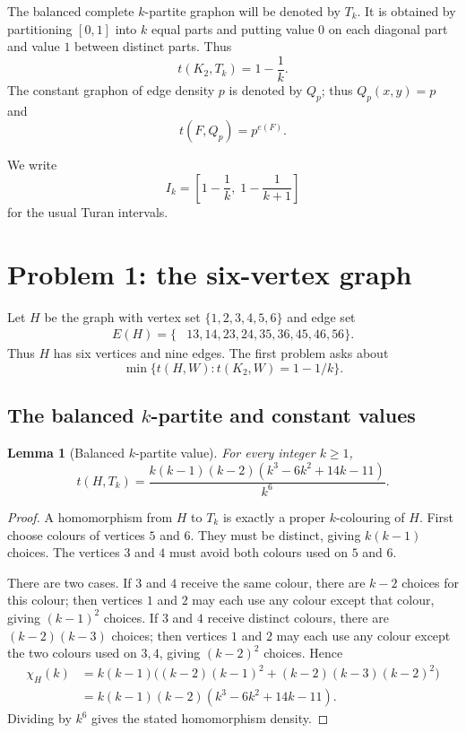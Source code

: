 \documentclass[11pt]{amsart}
\newtheorem{lemma}[theorem]{Lemma}
\theoremstyle{definition}
\newcommand{\1}{\mathbf 1}
\begin{document}
The balanced complete $k$-partite graphon will be denoted by $T_k$.  It is obtained by partitioning $[0,1]$ into $k$ equal parts and putting value $0$ on each diagonal part and value $1$ between distinct parts.  Thus
\[
   t(K_2,T_k)=1-\frac1k.
\]
The constant graphon of edge density $p$ is denoted by $Q_p$; thus $Q_p(x,y)=p$ and
\[
   t(F,Q_p)=p^{e(F)}.
\]

We write
\[
   I_k=\left[1-\frac1k,\;1-\frac1{k+1}\right]
\]
for the usual Turan intervals.

\section{Problem 1: the six-vertex graph}

Let $H$ be the graph with vertex set $\{1,2,3,4,5,6\}$ and edge set
\[
\begin{split}
E(H)=\{&13,14,23,24,35,36,45,46,56\}.
\end{split}
\]
Thus $H$ has six vertices and nine edges.  The first problem asks about
\[
   \min\{t(H,W):t(K_2,W)=1-1/k\}.
\]

\subsection{The balanced $k$-partite and constant values}

\begin{lemma}[Balanced $k$-partite value]
For every integer $k\ge 1$,
\[
   t(H,T_k)=\frac{k(k-1)(k-2)(k^3-6k^2+14k-11)}{k^6}.
\]
\end{lemma}

\begin{proof}
A homomorphism from $H$ to $T_k$ is exactly a proper $k$-colouring of $H$.  First choose colours of vertices $5$ and $6$.  They must be distinct, giving $k(k-1)$ choices.  The vertices $3$ and $4$ must avoid both colours used on $5$ and $6$.

There are two cases.  If $3$ and $4$ receive the same colour, there are $k-2$ choices for this colour; then vertices $1$ and $2$ may each use any colour except that colour, giving $(k-1)^2$ choices.  If $3$ and $4$ receive distinct colours, there are $(k-2)(k-3)$ choices; then vertices $1$ and $2$ may each use any colour except the two colours used on $3,4$, giving $(k-2)^2$ choices.  Hence
\[
\begin{split}
\chi_H(k)&=k(k-1)\bigl((k-2)(k-1)^2+(k-2)(k-3)(k-2)^2\bigr)\\
&=k(k-1)(k-2)(k^3-6k^2+14k-11).
\end{split}
\]
Dividing by $k^6$ gives the stated homomorphism density.
\end{proof}
\end{document}
